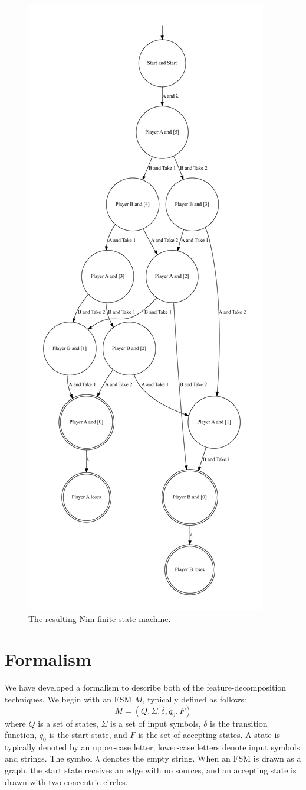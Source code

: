 \documentclass[sigplan,anonymous,review]{acmart}
\begin{document}
\begin{figure}
    \centering
    \includegraphics[width=0.6\linewidth]{figures/nimexample/nimFSM.pdf}
    \caption{The resulting Nim finite state machine.}
    \label{fig:nimFSM}
\end{figure}

\section{Formalism}\label{sec:formal}
We have developed a formalism to describe both of the feature-decomposition techniques. We begin with an FSM $M$, typically defined as follows: 
\[M = (Q, \Sigma, \delta, q_0, F)\]where $Q$ is a set of states, $\Sigma$ is a set of input symbols, $\delta$ is the transition function, $q_0$ is the start state, and $F$ is the set of accepting states.  A state is typically denoted by an upper-case letter;  lower-case letters denote input symbols and strings.  The symbol $\lambda$ denotes the empty string.  When an FSM is drawn as a graph, the start state receives an edge with no sources, and an accepting state is drawn with two concentric circles. 
\end{document}
